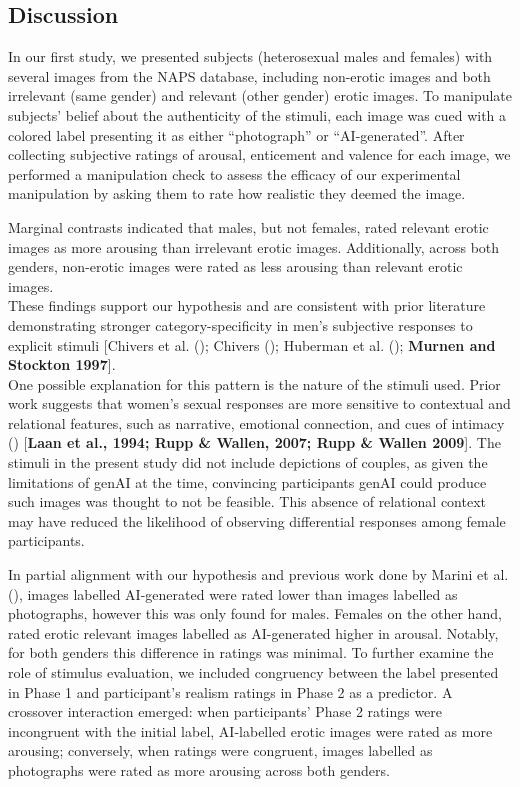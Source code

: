\documentclass[
  jou,
  floatsintext,
  longtable,
  nolmodern,
  notxfonts,
  notimes,
  colorlinks=true,linkcolor=blue,citecolor=blue,urlcolor=blue]{apa7}
\begin{document}
\subsection{Discussion}\label{discussion}

In our first study, we presented subjects (heterosexual males and
females) with several images from the NAPS database, including
non-erotic images and both irrelevant (same gender) and relevant (other
gender) erotic images. To manipulate subjects' belief about the
authenticity of the stimuli, each image was cued with a colored label
presenting it as either ``photograph'' or ``AI-generated''. After
collecting subjective ratings of arousal, enticement and valence for
each image, we performed a manipulation check to assess the efficacy of
our experimental manipulation by asking them to rate how realistic they
deemed the image.

Marginal contrasts indicated that males, but not females, rated relevant
erotic images as more arousing than irrelevant erotic images.
Additionally, across both genders, non-erotic images were rated as less
arousing than relevant erotic images.\\
These findings support our hypothesis and are consistent with prior
literature demonstrating stronger category-specificity in men's
subjective responses to explicit stimuli {[}Chivers et al.
(); Chivers
(); Huberman et al.
(); \textbf{Murnen and Stockton
1997}{]}.\\
One possible explanation for this pattern is the nature of the stimuli
used. Prior work suggests that women's sexual responses are more
sensitive to contextual and relational features, such as narrative,
emotional connection, and cues of intimacy
() {[}\textbf{Laan et al., 1994; Rupp
\& Wallen, 2007; Rupp \& Wallen 2009}{]}. The stimuli in the present
study did not include depictions of couples, as given the limitations of
genAI at the time, convincing participants genAI could produce such
images was thought to not be feasible. This absence of relational
context may have reduced the likelihood of observing differential
responses among female participants.

In partial alignment with our hypothesis and previous work done by
Marini et al. (), images labelled
AI-generated were rated lower than images labelled as photographs,
however this was only found for males. Females on the other hand, rated
erotic relevant images labelled as AI-generated higher in arousal.
Notably, for both genders this difference in ratings was minimal. To
further examine the role of stimulus evaluation, we included congruency
between the label presented in Phase 1 and participant's realism ratings
in Phase 2 as a predictor. A crossover interaction emerged: when
participants' Phase 2 ratings were incongruent with the initial label,
AI-labelled erotic images were rated as more arousing; conversely, when
ratings were congruent, images labelled as photographs were rated as
more arousing across both genders.
\end{document}
